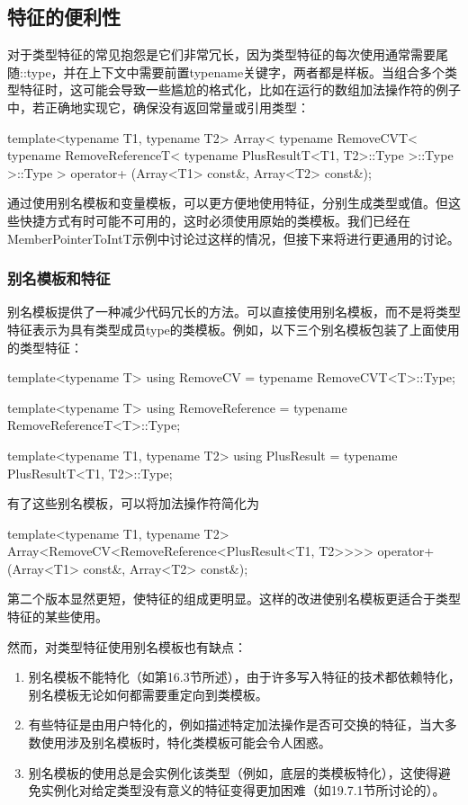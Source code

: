 \subsection{特征的便利性}

对于类型特征的常见抱怨是它们非常冗长，因为类型特征的每次使用通常需要尾随::type，并在上下文中需要前置typename关键字，两者都是样板。当组合多个类型特征时，这可能会导致一些尴尬的格式化，比如在运行的数组加法操作符的例子中，若正确地实现它，确保没有返回常量或引用类型：

\begin{cpp}
template<typename T1, typename T2>
Array<
	typename RemoveCVT<
		typename RemoveReferenceT<
			typename PlusResultT<T1, T2>::Type
		>::Type
	>::Type
>
operator+ (Array<T1> const&, Array<T2> const&);
\end{cpp}

通过使用别名模板和变量模板，可以更方便地使用特征，分别生成类型或值。但这些快捷方式有时可能不可用的，这时必须使用原始的类模板。我们已经在MemberPointerToIntT示例中讨论过这样的情况，但接下来将进行更通用的讨论。

\subsubsection{别名模板和特征}

别名模板提供了一种减少代码冗长的方法。可以直接使用别名模板，而不是将类型特征表示为具有类型成员type的类模板。例如，以下三个别名模板包装了上面使用的类型特征：

\begin{cpp}
template<typename T>
using RemoveCV = typename RemoveCVT<T>::Type;

template<typename T>
using RemoveReference = typename RemoveReferenceT<T>::Type;

template<typename T1, typename T2>
using PlusResult = typename PlusResultT<T1, T2>::Type;
\end{cpp}

有了这些别名模板，可以将加法操作符简化为

\begin{cpp}
template<typename T1, typename T2>
Array<RemoveCV<RemoveReference<PlusResult<T1, T2>>>>
operator+ (Array<T1> const&, Array<T2> const&);
\end{cpp}

第二个版本显然更短，使特征的组成更明显。这样的改进使别名模板更适合于类型特征的某些使用。

然而，对类型特征使用别名模板也有缺点：

\begin{enumerate}
\item
别名模板不能特化（如第16.3节所述），由于许多写入特征的技术都依赖特化，别名模板无论如何都需要重定向到类模板。

\item 
有些特征是由用户特化的，例如描述特定加法操作是否可交换的特征，当大多数使用涉及别名模板时，特化类模板可能会令人困惑。

\item
别名模板的使用总是会实例化该类型（例如，底层的类模板特化），这使得避免实例化对给定类型没有意义的特征变得更加困难（如19.7.1节所讨论的）。
\end{enumerate}

